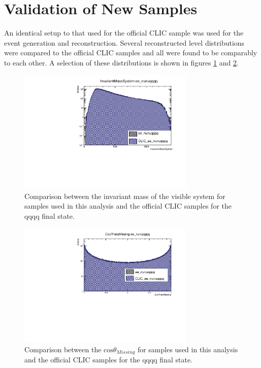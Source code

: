 \section{Validation of New Samples}

An identical setup to that used for the official CLIC sample was used for the event generation and reconstruction. Several reconstructed level distributions were compared to the official CLIC samples and all were found to be comparably to each other. A selection of these distributions is shown in figures \ref{fig:cliccomp1} and \ref{fig:cliccomp2}.

\begin{figure}
\centering
\includegraphics[width=0.75\textwidth]{PhysicsAnalysis/Plots/CLICSampleComparison/InvariantMassSystem.pdf}
\caption[Comparison between the invariant mass of the visible system for samples used in this analysis and the official CLIC samples for the \nu{\nu}qqqq final state.]{Comparison between the invariant mass of the visible system for samples used in this analysis and the official CLIC samples for the \nu{\nu}qqqq final state.}
\label{fig:cliccomp1}
\end{figure}

\begin{figure}
\centering
\includegraphics[width=0.75\textwidth]{PhysicsAnalysis/Plots/CLICSampleComparison/CosThetaMissing.pdf}
\caption[Comparison between the $\text{cos}\theta_{Missing}$ for samples used in this analysis and the official CLIC samples for the \nu{\nu}qqqq final state.]{Comparison between the $\text{cos}\theta_{Missing}$ for samples used in this analysis and the official CLIC samples for the \nu{\nu}qqqq final state.}
\label{fig:cliccomp2}
\end{figure}

